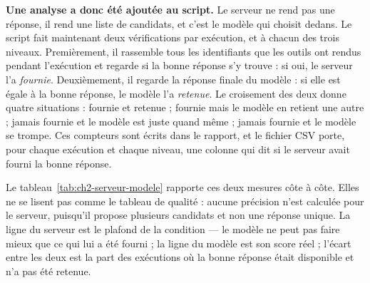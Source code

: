 \textbf{Une analyse a donc été ajoutée au script.} Le serveur ne rend pas une réponse, il rend une liste de candidats, et c'est le modèle qui choisit dedans. Le script fait maintenant deux vérifications par exécution, et à chacun des trois niveaux. Premièrement, il rassemble tous les identifiants que les outils ont rendus pendant l'exécution et regarde si la bonne réponse s'y trouve : si oui, le serveur l'a \emph{fournie}. Deuxièmement, il regarde la réponse finale du modèle : si elle est égale à la bonne réponse, le modèle l'a \emph{retenue}. Le croisement des deux donne quatre situations : fournie et retenue ; fournie mais le modèle en retient une autre ; jamais fournie et le modèle est juste quand même ; jamais fournie et le modèle se trompe. Ces compteurs sont écrits dans le rapport, et le fichier CSV porte, pour chaque exécution et chaque niveau, une colonne qui dit si le serveur avait fourni la bonne réponse.

Le tableau~\ref{tab:ch2-serveur-modele} rapporte ces deux mesures côte à côte. Elles ne se lisent pas comme le tableau de qualité : aucune précision n'est calculée pour le serveur, puisqu'il propose plusieurs candidats et non une réponse unique. La ligne du serveur est le plafond de la condition --- le modèle ne peut pas faire mieux que ce qui lui a été fourni ; la ligne du modèle est son score réel ; l'écart entre les deux est la part des exécutions où la bonne réponse était disponible et n'a pas été retenue.

